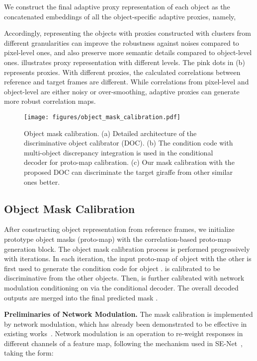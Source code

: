 \documentclass[sigconf]{acmart}
\begin{document}
We construct the final adaptive proxy representation  of each object  as the concatenated embeddings of all the object-specific adaptive proxies, namely,


Accordingly, representing the objects with proxies constructed with clusters from different granularities can improve the robustness against noises compared to pixel-level ones, and also preserve more semantic details compared to object-level ones.
\fig{\ref{fig:object_representation}} illustrates proxy representation with different levels. The pink dots in \fig{\ref{fig:object_representation}} (b) represents proxies. With different proxies, the calculated correlations between reference and target frames are different. While correlations from pixel-level and object-level are either noisy or over-smoothing, adaptive proxies can generate more robust correlation maps.

\begin{figure}[t]
	\centering
	\texttt{[image: figures/object\_mask\_calibration.pdf]}
\caption{Object mask calibration. (a) Detailed architecture of the discriminative object calibrator (DOC). (b) The condition code  with multi-object discrepancy integration is used in the conditional decoder for proto-map calibration. (c) Our mask calibration with the proposed DOC can discriminate the target giraffe from other similar ones better. }
\label{fig:multi-object-discrimination}
\end{figure} 
\subsection{Object Mask Calibration}  
\label{sec:method/relational_modulation_network}

After constructing object representation from reference frames, we initialize prototype object masks (proto-map) with the correlation-based proto-map generation block. The object mask calibration process is performed progressively with  iterations. In each iteration, the input proto-map  of object  with the other  is first used to generate the condition code  for object .  is calibrated to be discriminative from the other objects. Then,  is further calibrated with network modulation conditioning on  via the conditional decoder. The overall decoded outputs  are merged into the final predicted mask .

\noindent\textbf{Preliminaries of Network Modulation.}
The mask calibration is implemented by network modulation, which has already been demonstrated to be effective in existing works~\cite{Yang2018osmn,yang2020collaborative,yang2021collaborative}. Network modulation is an operation to re-weight responses in different channels of a feature map, following the mechanism used in SE-Net~\cite{hu_senet_cvpr2018}, taking the form: 
\end{document}
